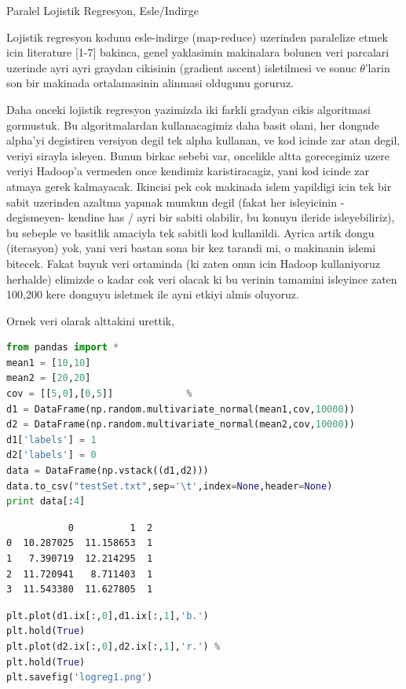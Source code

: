 \documentclass[12pt,fleqn]{article}\usepackage{../common}
\begin{document}
Paralel Lojistik Regresyon, Esle/Indirge

Lojistik regresyon kodunu esle-indirge (map-reduce) uzerinden paralelize
etmek icin literature [1-7] bakinca, genel yaklasimin makinalara bolunen
veri parcalari uzerinde ayri ayri graydan cikisinin (gradient ascent)
isletilmesi ve sonuc $\theta$'larin son bir makinada ortalamasinin alinmasi
oldugunu goruruz.

Daha onceki lojistik regresyon yazimizda iki farkli gradyan cikis
algoritmasi gormustuk. Bu algoritmalardan kullanacagimiz daha basit olani,
her dongude alpha'yi degistiren versiyon degil tek alpha kullanan, ve kod
icinde zar atan degil, veriyi sirayla isleyen. Bunun birkac sebebi var,
oncelikle altta gorecegimiz uzere veriyi Hadoop'a vermeden once kendimiz
karistiracagiz, yani kod icinde zar atmaya gerek kalmayacak. Ikincisi pek
cok makinada islem yapildigi icin tek bir sabit uzerinden azaltma yapmak
mumkun degil (fakat her isleyicinin -degismeyen- kendine has / ayri bir
sabiti olabilir, bu konuyu ileride isleyebiliriz), bu sebeple ve basitlik
amaciyla tek sabitli kod kullanildi. Ayrica artik dongu (iterasyon) yok,
yani veri bastan sona bir kez tarandi mi, o makinanin islemi bitecek. Fakat
buyuk veri ortaminda (ki zaten onun icin Hadoop kullaniyoruz herhalde)
elimizde o kadar cok veri olacak ki bu verinin tamamini isleyince zaten
100,200 kere donguyu isletmek ile ayni etkiyi almis oluyoruz.

Ornek veri olarak alttakini urettik,

\begin{lstlisting}[language=Python]
from pandas import *
mean1 = [10,10]
mean2 = [20,20]
cov = [[5,0],[0,5]]             %
d1 = DataFrame(np.random.multivariate_normal(mean1,cov,10000))
d2 = DataFrame(np.random.multivariate_normal(mean2,cov,10000))
d1['labels'] = 1
d2['labels'] = 0
data = DataFrame(np.vstack((d1,d2)))
data.to_csv("testSet.txt",sep='\t',index=None,header=None)
print data[:4]
\end{lstlisting}

\begin{verbatim}
           0          1  2
0  10.287025  11.158653  1
1   7.390719  12.214295  1
2  11.720941   8.711403  1
3  11.543380  11.627805  1
\end{verbatim}

\begin{lstlisting}[language=Python]
%pylab inline
plt.plot(d1.ix[:,0],d1.ix[:,1],'b.')
plt.hold(True)
plt.plot(d2.ix[:,0],d2.ix[:,1],'r.') %
plt.hold(True)
plt.savefig('logreg1.png')
\end{lstlisting}
\end{document}
